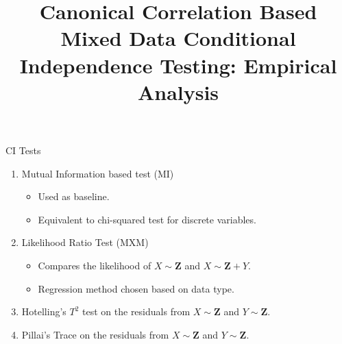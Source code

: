 \documentclass{beamer}
\begin{document}
\title[]{Canonical Correlation Based Mixed Data Conditional Independence Testing: Empirical Analysis}
\author{}
\date{}

\maketitle

\begin{frame}{CI Tests}
	\begin{enumerate}
		\item Mutual Information based test (MI) \footnotemark
			\begin{itemize}
				\item Used as baseline.
				\item Equivalent to chi-squared test for discrete variables.
			\end{itemize}
		\item Likelihood Ratio Test (MXM) \footnotemark
			\begin{itemize}
				\item Compares the likelihood of $ X \sim \bm{Z} $ and $ X \sim \bm{Z} + Y $.
				\item Regression method chosen based on data type.
			\end{itemize}
		\item Hotelling's $T^2$ test on the residuals from $ X \sim \mathbf{Z} $ and $ Y \sim \mathbf{Z} $. \footnotemark
		\item Pillai's Trace on the residuals from $ X \sim \mathbf{Z} $ and $ Y \sim \mathbf{Z} $.
	\end{enumerate}


\end{frame}
\end{document}

